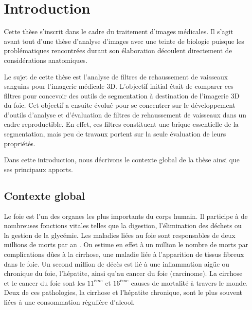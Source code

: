 %

\chapter{Introduction}
\label{sec:introduction}


Cette thèse s'inscrit dans le cadre du traitement d'images médicales. Il s'agit avant tout d'une thèse d'analyse d'images avec une teinte de biologie puisque les problématiques rencontrées durant son élaboration découlent directement de considérations anatomiques.

Le sujet de cette thèse est l'analyse de filtres de rehaussement de vaisseaux sanguins pour l'imagerie médicale 3D. L'objectif initial était de comparer ces filtres pour concevoir des outils de segmentation à destination de l'imagerie 3D du foie. Cet objectif a ensuite évolué pour se concentrer sur le développement d'outils d'analyse et d'évaluation de filtres de rehaussement de vaisseaux dans un cadre reproductible. En effet, ces filtres constituent une brique essentielle de la segmentation, mais peu de travaux portent sur la seule évaluation de leurs propriétés.

Dans cette introduction, nous décrivons le contexte global de la thèse ainsi que ses principaux apports.

\section{Contexte global}


Le foie est l'un des organes les plus importants du corps humain. Il participe à de nombreuses fonctions vitales telles que la digestion, l'élimination des déchets ou la gestion de la glycémie. Les maladies liées au foie sont responsables de deux millions de morts par an \cite{Asrani2019_liver_deseases}. On estime en effet à un million le nombre de morts par complications dûes à la cirrhose, une maladie liée à l'apparition de tissus fibreux dans le foie. Un second million de décès est lié à une inflammation aigüe ou chronique du foie, l'hépatite, ainsi qu'au cancer du foie (carcinome). La cirrhose et le cancer du foie sont les $11^{ème}$ et $16^{ème}$ causes de mortalité à travers le monde. Deux de ces pathologies, la cirrhose et l'hépatite chronique, sont le plus souvent liées à une consommation régulière d'alcool. 

